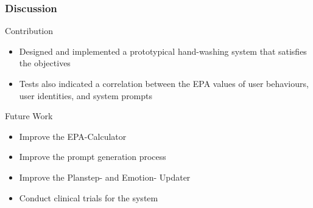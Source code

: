 \documentclass{beamer}
\begin{document}
\begin{frame}
\frametitle{Discussion}
Contribution
\begin{itemize}
\item Designed and implemented a prototypical hand-washing system that satisfies the objectives
\item Tests also indicated a correlation between the EPA values of user behaviours, user identities, and system prompts
\end{itemize}
\vspace{.3cm}
Future Work
\begin{itemize}
\item{Improve the EPA-Calculator}
\item{Improve the prompt generation process}
\item{Improve the Planstep- and Emotion- Updater}
\item{Conduct clinical trials for the system}
\end{itemize}
\end{frame}
\end{document}
